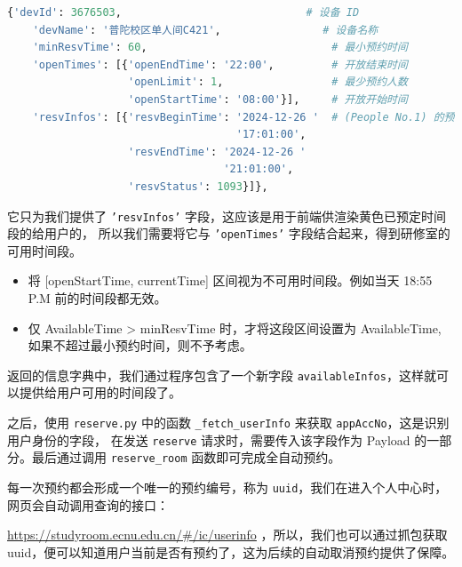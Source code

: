 \documentclass[14pt,a4paper,UTF8,twoside]{article}
\begin{document}
    \begin{lstlisting}[language=python]
    {'devId': 3676503,                             # 设备 ID
    'devName': '普陀校区单人间C421',                # 设备名称
    'minResvTime': 60,                             # 最小预约时间
    'openTimes': [{'openEndTime': '22:00',         # 开放结束时间
                   'openLimit': 1,                 # 最少预约人数
                   'openStartTime': '08:00'}],     # 开放开始时间
    'resvInfos': [{'resvBeginTime': '2024-12-26 '  # (People No.1) 的预约信息
                                    '17:01:00',
                   'resvEndTime': '2024-12-26 '
                                  '21:01:00',
                   'resvStatus': 1093}]},
    \end{lstlisting}

    它只为我们提供了 \texttt{'resvInfos'} 字段，这应该是用于前端供渲染黄色已预定时间段的给用户的，
    所以我们需要将它与 \texttt{'openTimes'} 字段结合起来，得到研修室的可用时间段。

    \begin{note}
        \begin{itemize}
            \item 将 [openStartTime, currentTime] 区间视为不可用时间段。例如当天 18:55 P.M 前的时间段都无效。
            \item 仅 AvailableTime > minResvTime 时，才将这段区间设置为 AvailableTime, 如果不超过最小预约时间，则不予考虑。
        \end{itemize}
    \end{note}

    返回的信息字典中，我们通过程序包含了一个新字段 \texttt{availableInfos}，这样就可以提供给用户可用的时间段了。

    之后，使用 \texttt{reserve.py} 中的函数 \texttt{\_fetch\_userInfo} 来获取 \texttt{appAccNo}，这是识别用户身份的字段，
    在发送 \texttt{reserve} 请求时，需要传入该字段作为 Payload 的一部分。最后通过调用 \texttt{reserve\_room} 函数即可完成全自动预约。

    \begin{note}
        每一次预约都会形成一个唯一的预约编号，称为 \texttt{uuid}，我们在进入个人中心时，网页会自动调用查询的接口：

        \href{https://studyroom.ecnu.edu.cn/#/ic/userinfo}{\underline{https://studyroom.ecnu.edu.cn/\#/ic/userinfo}}
        ，所以，我们也可以通过抓包获取 uuid，便可以知道用户当前是否有预约了，这为后续的自动取消预约提供了保障。
    \end{note}
\end{document}
